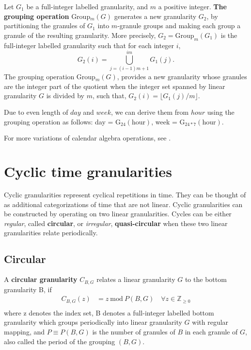 \documentclass[12pt]{article}
\begin{document}
\begin{definition}\label{def:grouping_operation}
Let $G_1$ be a full-integer labelled granularity, and $m$ a positive integer. {\bf The grouping operation} Group$_m(G)$ generates a new granularity $G_2$, by partitioning the granules of $G_1$ into $m$-granule groups and making each group a granule of the resulting granularity. More precisely, $G_2 = \text{Group}_m(G_1)$ is the full-integer labelled granularity such that for each integer $i$,
$$G_2(i) = \bigcup\limits_{j = (i-1)m+1}^{im} G_1(j).$$
The grouping operation Group$_m(G)$, provides a new granularity whose granules are the integer part of the quotient when the integer set spanned by linear granularity $G$ is divided by $m$, such that, $G_2(i) = \lfloor G_1(j)/m \rfloor$.
\end{definition}

\begin{example} 
{\rm Due to even length of $day$ and $week$, we can derive them from $hour$ using the grouping operation as follows: day = G$_{24}(\text{hour})$, week = G$_{24*7}(\text{hour})$.}
\end{example}

\noindent For more variations of calendar algebra operations, see \citet{Ning_2002}.

\hypertarget{sec:cyclic-gran}{%
\section{Cyclic time granularities}\label{sec:cyclic-gran}}

Cyclic granularities represent cyclical repetitions in time. They can be thought of as additional categorizations of time that are not linear. Cyclic granularities can be constructed by operating on two linear granularities. Cycles can be either \emph{regular}, called \textbf{circular}, or \emph{irregular}, \textbf{quasi-circular} when these two linear granularities relate periodically.

\hypertarget{sec:circular-gran-def}{%
\subsection{Circular}\label{sec:circular-gran-def}}

\begin{definition}\label{def:circular}
A {\bf circular granularity} $C_{B, G}$ relates a linear granularity $G$ to the bottom granularity B, if
\begin{equation} \label{eq:circular-gran}
\begin{split}
C_{B, G}(z) & = z~\text{mod}~P(B, G) \quad \forall z \in \mathbb{Z}_{\geq 0} \\
\end{split}
\end{equation}
where
z denotes the index set,
B denotes a full-integer labelled bottom granularity which groups periodically into linear granularity $G$ with regular mapping, and $P \equiv P(B, G)$ is the number of granules of $B$ in each granule of $G$, also called the period of the grouping $(B, G)$.
\end{definition}
\end{document}
